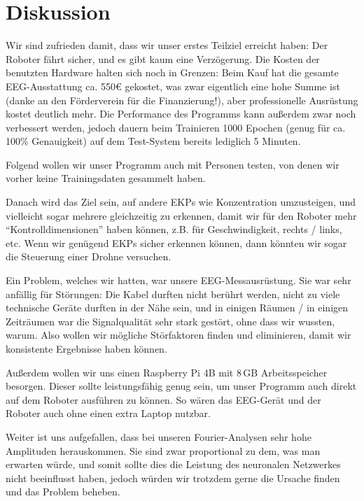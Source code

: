 \documentclass[11pt]{scrartcl}
\begin{document}
	\section{Diskussion}

	Wir sind zufrieden damit, dass wir unser erstes Teilziel erreicht haben: Der Roboter fährt sicher, und es gibt kaum eine Verzögerung. Die Kosten der benutzten Hardware halten sich noch in Grenzen: Beim Kauf hat die gesamte EEG-Ausstattung ca. 550€ gekostet, was zwar eigentlich eine hohe Summe ist (danke an den Förderverein für die Finanzierung!), aber professionelle Ausrüstung kostet deutlich mehr. Die Performance des Programms kann außerdem zwar noch verbessert werden, jedoch dauern beim Trainieren 1000 Epochen (genug für ca. 100\% Genauigkeit) auf dem Test-System bereits lediglich 5 Minuten. 

	Folgend wollen wir unser Programm auch mit Personen testen, von denen wir vorher keine Trainingsdaten gesammelt haben.

	Danach wird das Ziel sein, auf andere EKPs wie Konzentration umzusteigen, und vielleicht sogar mehrere gleichzeitig zu erkennen, damit wir für den Roboter mehr \enquote{Kontrolldimensionen} haben können, z.B. für Geschwindigkeit, rechts / links, etc. Wenn wir genügend EKPs sicher erkennen können, dann könnten wir sogar die Steuerung einer Drohne versuchen.

	Ein Problem, welches wir hatten, war unsere EEG-Messausrüstung. Sie war sehr anfällig für Störungen: Die Kabel durften nicht berührt werden, nicht zu viele technische Geräte durften in der Nähe sein, und in einigen Räumen / in einigen Zeiträumen war die Signalqualität sehr stark gestört, ohne dass wir wussten, warum. Also wollen wir mögliche Störfaktoren finden und eliminieren, damit wir konsistente Ergebnisse haben können.

	Außerdem wollen wir uns einen Raspberry Pi 4B mit 8\,GB Arbeitsspeicher besorgen. Dieser sollte leistungsfähig genug sein, um unser Programm auch direkt auf dem Roboter ausführen zu können. So wären das EEG-Gerät und der Roboter auch ohne einen extra Laptop nutzbar.

	Weiter ist uns aufgefallen, dass bei unseren Fourier-Analysen sehr hohe Amplituden herauskommen. Sie sind zwar proportional zu dem, was man erwarten würde, und somit sollte dies die Leistung des neuronalen Netzwerkes nicht beeinflusst haben, jedoch würden wir trotzdem gerne die Ursache finden und das Problem beheben. 


	\newpage
\end{document}
